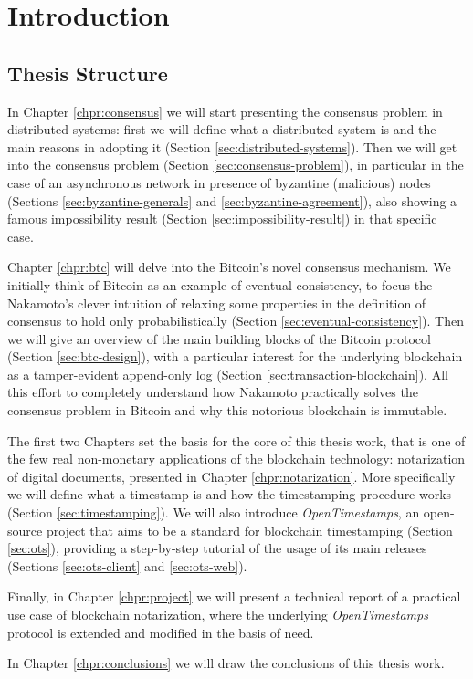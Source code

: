 \chapter{Introduction}
\label{chpr:intro}

\section{Thesis Structure}
In Chapter \ref{chpr:consensus} we will start presenting the consensus problem in distributed systems: first we will define what a distributed system is and the main reasons in adopting it (Section \ref{sec:distributed-systems}). Then we will get into the consensus problem (Section \ref{sec:consensus-problem}), in particular in the case of an asynchronous network in presence of byzantine (malicious) nodes (Sections \ref{sec:byzantine-generals} and \ref{sec:byzantine-agreement}), also showing a famous impossibility result (Section \ref{sec:impossibility-result}) in that specific case.

\bigskip
\noindent
Chapter \ref{chpr:btc} will delve into the Bitcoin's novel consensus mechanism. We initially think of Bitcoin as an example of eventual consistency, to focus the Nakamoto's clever intuition of relaxing some properties in the definition of consensus to hold only probabilistically (Section \ref{sec:eventual-consistency}). Then we will give an overview of the main building blocks of the Bitcoin protocol (Section \ref{sec:btc-design}), with a particular interest for the underlying blockchain as a tamper-evident append-only log (Section \ref{sec:transaction-blockchain}). All this effort to completely understand how Nakamoto practically solves the consensus problem in Bitcoin and why this notorious blockchain is immutable.

\bigskip
\noindent
The first two Chapters set the basis for the core of this thesis work, that is one of the few real non-monetary applications of the blockchain technology: notarization of digital documents, presented in Chapter \ref{chpr:notarization}. More specifically we will define what a timestamp is and how the timestamping procedure works (Section \ref{sec:timestamping}). We will also introduce \textit{OpenTimestamps}, an open-source project that aims to be a standard for blockchain timestamping (Section \ref{sec:ots}), providing a step-by-step tutorial of the usage of its main releases (Sections \ref{sec:ots-client} and \ref{sec:ots-web}).

\bigskip
\noindent
Finally, in Chapter \ref{chpr:project} we will present a technical report of a practical use case of blockchain notarization, where the underlying \textit{OpenTimestamps} protocol is extended and modified in the basis of need.

\bigskip
\noindent
In Chapter \ref{chpr:conclusions} we will draw the conclusions of this thesis work.